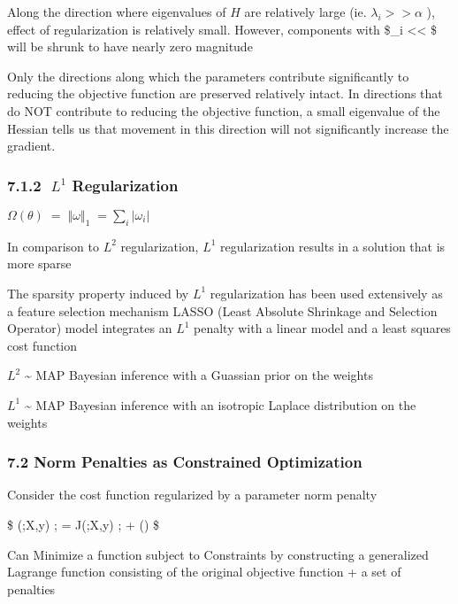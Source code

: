 \documentclass[11pt]{article}
\begin{document}
    Along the direction where eigenvalues of \(H\) are relatively large (ie.
\(\lambda_i >> \alpha\) ), effect of regularization is relatively small.
However, components with \$\lambda\_i \textless{}\textless{} \alpha \$
will be shrunk to have nearly zero magnitude

    Only the directions along which the parameters contribute significantly
to reducing the objective function are preserved relatively intact. In
directions that do NOT contribute to reducing the objective function, a
small eigenvalue of the Hessian tells us that movement in this direction
will not significantly increase the gradient.

    \hypertarget{l1-regularization}{%
\subsubsection{\texorpdfstring{7.1.2 \(\;L^1\)
Regularization}{7.1.2 \textbackslash{};L\^{}1 Regularization}}\label{l1-regularization}}

    \(\Omega (\theta) \; = \; \left\Vert{\omega}\right\Vert_1 \; = \sum_{i} \left\vert {\omega_i}\right\vert\)

    In comparison to \(L^2\) regularization, \(L^1\) regularization results
in a solution that is more sparse

    The sparsity property induced by \(L^1\) regularization has been used
extensively as a feature selection mechanism LASSO (Least Absolute
Shrinkage and Selection Operator) model integrates an \(L^1\) penalty
with a linear model and a least squares cost function

    \(L^2\) \textasciitilde{} MAP Bayesian inference with a Guassian prior
on the weights

    \(L^1\) \textasciitilde{} MAP Bayesian inference with an isotropic
Laplace distribution on the weights

    \hypertarget{norm-penalties-as-constrained-optimization}{%
\subsubsection{7.2 Norm Penalties as Constrained
Optimization}\label{norm-penalties-as-constrained-optimization}}

    Consider the cost function regularized by a parameter norm penalty 

    \$ (\theta;X,y) ; = J(\theta;X,y) ; + \alpha\Omega(\theta) \$

    Can Minimize a function subject to Constraints by constructing a
generalized Lagrange function consisting of the original objective
function + a set of penalties 
\end{document}
